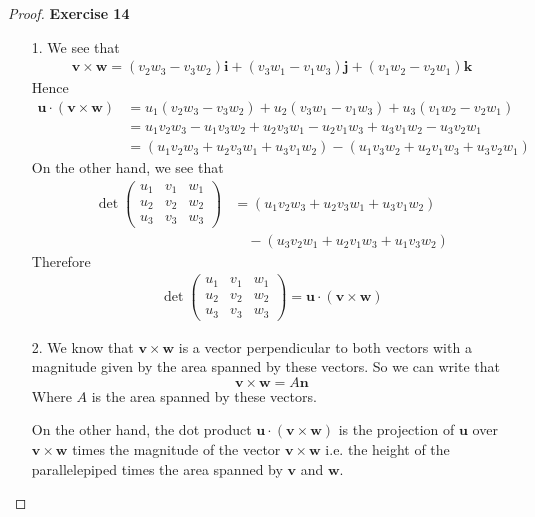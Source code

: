 \documentclass[11pt]{article}
\newcommand{\uvi}{\bm{i}}
\newcommand{\uvj}{\bm{j}}
\newcommand{\uvk}{\bm{k}}
\theoremstyle{definition}
\begin{document}
\cleardoublepage
\begin{proof}{\textbf{Exercise 14}}
\begin{itemize}
    \item [1.] We see that 
    \begin{align*}
        \bm{v}\times\bm{w}
        = (v_2w_3 - v_3w_2)\uvi + (v_3w_1 - v_1w_3)\uvj + (v_1w_2 - v_2w_1)\uvk
    \end{align*}
    Hence
    \begin{align*}
        \bm{u}\cdot(\bm{v}\times\bm{w})
        &= u_1(v_2w_3 - v_3w_2) + u_2(v_3w_1 - v_1w_3) + u_3(v_1w_2 - v_2w_1)\\
        &= u_1v_2w_3 - u_1v_3w_2 + u_2v_3w_1 - u_2v_1w_3 + u_3v_1w_2 - u_3v_2w_1\\
        &= (u_1v_2w_3 + u_2v_3w_1 + u_3v_1w_2) - (u_1v_3w_2 + u_2v_1w_3 + u_3v_2w_1)
    \end{align*}
    On the other hand, we see that
    \begin{align*}
        \det\begin{pmatrix}
            u_1 & v_1 & w_1\\
            u_2 & v_2 & w_2\\
            u_3 & v_3 & w_3
        \end{pmatrix}
        &= (u_1v_2w_3 + u_2v_3w_1 + u_3v_1w_2)\\
        &\quad- (u_3v_2w_1 + u_2v_1w_3 + u_1v_3w_2)
    \end{align*}
    Therefore
    \begin{align*}
        \det\begin{pmatrix}
            u_1 & v_1 & w_1\\
            u_2 & v_2 & w_2\\
            u_3 & v_3 & w_3
        \end{pmatrix} =
        \bm{u}\cdot(\bm{v}\times\bm{w})
    \end{align*}

    \item [2.] We know that $\bm{v}\times\bm{w}$ is a vector perpendicular
    to both vectors with a magnitude given by the area spanned by these vectors.
    So we can write that
    $$\bm{v}\times\bm{w} = A\bm{n}$$
    Where $A$ is the area spanned by these vectors.

    On the other hand, the dot product $\bm{u}\cdot(\bm{v}\times\bm{w})$ is
    the projection of $\bm{u}$ over $\bm{v}\times\bm{w}$ times the magnitude
    of the vector $\bm{v}\times\bm{w}$ i.e. the height of the parallelepiped
    times the area spanned by $\bm{v}$ and $\bm{w}$.


\end{itemize}
\end{proof}
\end{document}
